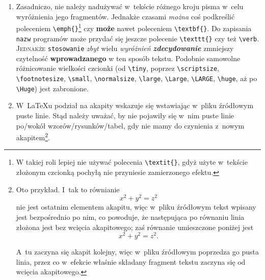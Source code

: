 \begin{enumerate}


\item Zasadniczo, nie należy nadużywać w~tekście różnego kroju pisma w~celu wyróżnienia jego fragmentów. Jednakże czasami \emph{można} coś podkreślić poleceniem \texttt{\textbackslash emph\{\}}\footnote{W takiej roli lepiej nie używać polecenia \texttt{\textbackslash textit\{\}}, gdyż użyte w~tekście złożonym czcionką pochyłą nie przyniesie zamierzonego efektu.} czy \textbf{może} nawet poleceniem \texttt{\textbackslash textbf\{\}}. Do zapisania \texttt{nazw} programów może przydać się jeszcze polecenie \texttt{\textbackslash texttt\{\}} czy też \texttt{\textbackslash verb}. \textsc{Jednakże} \texttt{stosowanie} \textit{zbyt} \textup{wielu} \textsl{wyróżnień} \textbf{\emph{zdecydowanie}} \textnormal{zmniejszy} \textsf{czytelność} \textbf{wprowadzanego} \textrm{w ten} \textmd{sposób} tekstu. Podobnie samowolne różnicowanie wielkości czcionki (od {\tiny\texttt{\textbackslash tiny}}, poprzez {\scriptsize\texttt{\textbackslash scriptsize}}, {\footnotesize\texttt{\textbackslash footnotesize}}, {\small\texttt{\textbackslash small}}, {\normalsize\texttt{\textbackslash normalsize}}, {\large\texttt{\textbackslash large}}, {\Large\texttt{\textbackslash Large}}, {\LARGE\texttt{\textbackslash LARGE}}, {\huge\texttt{\textbackslash huge}}, aż po {\Huge\texttt{\textbackslash Huge})} jest zabronione.

\item W~\LaTeX{}u podział na akapity wskazuje się wstawiając w~pliku źródłowym puste linie. Stąd należy uważać, by nie pojawiły się w~nim puste linie po/wokół wzorów/rysunków/tabel, gdy nie mamy do czynienia z~nowym akapitem\footnote{Oto przykład. I~tak to równianie
\begin{equation}
  x^2+y^2=z^2
\end{equation}
nie jest ostatnim elementem akapitu, więc w~pliku źródłowym tekst wpisany jest bezpośrednio po nim, co powoduje, że następująca po równaniu linia złożona jest bez wcięcia akapitowego; zaś równanie umieszczone poniżej jest
\begin{equation}
  x^2+y^2=z^2.
\end{equation}

A~tu zaczyna się akapit kolejny, więc w~pliku źródłowym poprzedza go pusta linia, przez co w~efekcie właśnie składany fragment tekstu zaczyna się od wcięcia akapitowego.}.


\end{enumerate}
